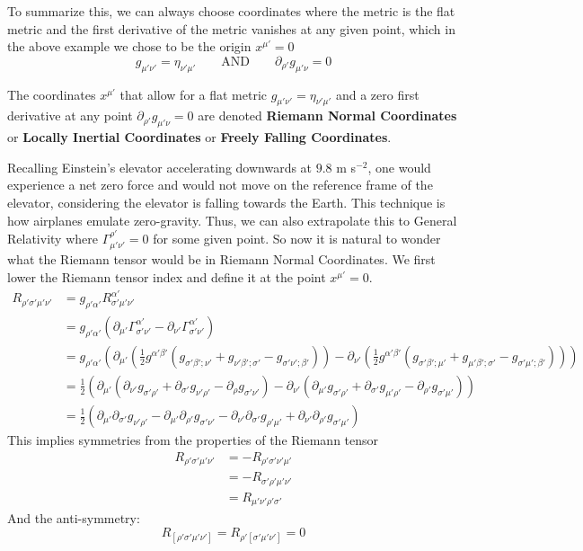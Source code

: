 \documentclass{article}
\begin{document}
 		To summarize this, we can always choose coordinates where the metric is the flat metric and the first derivative of the metric vanishes at any given point, which in the above example we chose to be the origin $x^{\mu'}=0$
 		$$ g_{\mu' \nu'} = \eta_{\nu'\mu'} \quad\quad \text{AND} \quad \quad \partial_{\rho'} g_{\mu' \nu} = 0$$
 		\begin{defn}
 			\label{defn:RNC}
 			The coordinates $x^{\mu'}$ that allow for a flat metric $g_{\mu' \nu'} = \eta_{\nu'\mu'}$ and a zero first derivative at any point $\partial_{\rho'} g_{\mu' \nu} = 0$ are denoted \textbf{Riemann Normal Coordinates} or \textbf{Locally Inertial Coordinates} or \textbf{Freely Falling Coordinates}.
 		\end{defn}
 		Recalling Einstein's elevator accelerating downwards at $9.8$ m s$^{-2}$, one would experience a net zero force and would not move on the reference frame of the elevator, considering the elevator is falling towards the Earth. This technique is how airplanes emulate zero-gravity. Thus, we can also extrapolate this to General Relativity where $\Gamma_{\mu'\nu'}^{\rho'} = 0$ for some given point. So now it is natural to wonder what the Riemann tensor would be in Riemann Normal Coordinates. We first lower the Riemann tensor index and define it at the point $x^{\mu'} = 0$.
 		\begin{align*}
 			R_{\rho'\sigma'\mu'\nu'} &= g_{\rho'\alpha'} R^{\alpha'}_{\sigma'\mu'\nu'} \\
 			&= g_{\rho'\alpha'} \left( \partial_{\mu'} \Gamma_{\sigma'\nu'}^{\alpha'} - \partial_{\nu'} \Gamma_{\sigma'\nu'}^{\alpha'} \right) \\
 			&=  g_{\rho'\alpha'} \left( \partial_{\mu'} \left( \frac12 g^{\alpha'\beta'} \left( g_{\sigma'\beta';\nu'} + g_{\nu'\beta';\sigma'} - g_{\sigma'\nu';\beta'}\right)\right) - \partial_{\nu'} \left( \frac12 g^{\alpha'\beta'} \left( g_{\sigma'\beta';\mu'} + g_{\mu'\beta';\sigma'} - g_{\sigma'\mu';\beta'}\right)\right) \right) \\
 			&= \frac12 \left( \partial_{\mu'} \left( \partial_{\nu'} g_{\sigma'\rho'} + \partial_{\sigma'} g_{\nu'\rho'} - \partial_\rho g_{\sigma'\nu'}\right) - \partial_{\nu'} \left( \partial_{\mu'} g_{\sigma' \rho'} + \partial_{\sigma'} g_{\mu'\rho'} - \partial_{\rho'} g_{\sigma'\mu'}\right)\right) \\
 			&= \frac12 \left( \partial_{\mu'} \partial_{\sigma'} g_{\nu'\rho'} - \partial_{\mu'} \partial_{\rho'} g_{\sigma'\nu'} - \partial_{\nu'} \partial_{\sigma'} g_{\rho'\mu'} + \partial_{\nu'} \partial_{\rho'} g_{\sigma'\mu'} \right)
 		\end{align*}
 		This implies symmetries from the properties of the Riemann tensor
 		\begin{align*}
 			R_{\rho'\sigma'\mu'\nu'} &= -R_{\rho'\sigma'\nu'\mu'} \\
 			 &= - R_{\sigma'\rho'\mu'\nu'} \\
 			 &= R_{\mu'\nu'\rho'\sigma'}
 		\end{align*}
 		And the anti-symmetry:
 		$$ R_{\left[ \rho' \sigma' \mu'\nu' \right]} = R_{\rho' \left[\sigma'\mu'\nu'\right]}=0$$
 		
\end{document}

